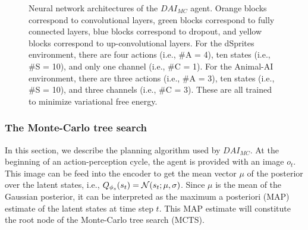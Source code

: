 \documentclass[twoside,11pt]{article}
\let\oldmathcal\mathcal
\renewcommand{\mathcal}[1]{%
  \IfSubStr{ABCDEFGHIJKLMNOPQRSTUVWXYZ}{#1}{\oldmathcal{#1}}{\mathdutchcal{#1}}
}
\begin{document}
\begin{figure}
\begin{center}
	\end{center}
	\caption{Neural network architectures of the $DAI_{MC}$ agent. Orange blocks correspond to convolutional layers, green blocks correspond to fully connected layers, blue blocks correspond to dropout, and yellow blocks correspond to up-convolutional layers. For the dSprites environment, there are four actions (i.e., \#A = 4), ten states (i.e., \#S = 10), and only one channel (i.e., \#C = 1). For the Animal-AI environment, there are three actions (i.e., \#A = 3), ten states (i.e., \#S = 10), and three channels (i.e., \#C = 3). These are all trained to minimize variational free energy.}
	\label{fig:fountas_dnn}
\end{figure}

\subsubsection{The Monte-Carlo tree search}

In this section, we describe the planning algorithm used by $DAI_{MC}$. At the beginning of an action-perception cycle, the agent is provided with an image $o_t$. This image can be feed into the encoder to get the mean vector $\mu$ of the posterior over the latent states, i.e., $Q_{\phi_s}(s_t) = \mathcal{N}(s_t;\mu, \sigma)$. Since $\mu$ is the mean of the Gaussian posterior, it can be interpreted as the maximum a posteriori (MAP) estimate of the latent states at time step $t$. This MAP estimate will constitute the root node of the Monte-Carlo tree search (MCTS).
\end{document}
